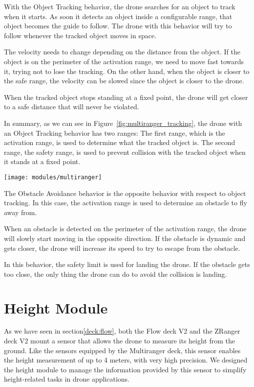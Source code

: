 With the Object Tracking behavior, the drone searches for an object to track when it starts. 
As soon it detects an object inside a configurable range, that object becomes the guide to follow. 
The drone with this behavior will try to follow whenever the tracked object moves in space. 

The velocity needs to change depending on the distance from the object. 
If the object is on the perimeter of the activation range, we need to move fast towards it, trying not to lose the tracking. 
On the other hand, when the object is closer to the safe range, the velocity can be slowed since the object is closer to the drone.

When the tracked object stops standing at a fixed point, the drone will get closer to a safe distance that will never be violated.

In summary, as we can see in Figure~\ref{fig:multiranger_tracking}, the drone with an Object Tracking behavior has two ranges:
The first range, which is the activation range, is used to determine what the tracked object is.
The second range, the safety range, is used to prevent collision with the tracked object when it stands at a fixed point.

\begin{SCfigure}[\sidecaptionrelwidth][h]
    \texttt{[image: modules/multiranger]}
    \caption{Multiranger Object Tracking behavior}\label{fig:multiranger_tracking}
\end{SCfigure}

The Obstacle Avoidance behavior is the opposite behavior with respect to object tracking. 
In this case, the activation range is used to determine an obstacle to fly away from.

When an obstacle is detected on the perimeter of the activation range, the drone will slowly start moving in the opposite direction. 
If the obstacle is dynamic and gets closer, the drone will increase its speed to try to escape from the obstacle.

In this behavior, the safety limit is used for landing the drone. 
If the obstacle gets too close, the only thing the drone can do to avoid the collision is landing.

\section{Height Module}\label{sec:module_height}

As we have seen in section\ref{deck:flow}, both the Flow deck V2 and the ZRanger deck V2 mount a sensor that allows the drone to measure its height from the ground.
Like the sensors equipped by the Multiranger deck, this sensor enables the height measurement of up to 4 meters, with very high precision.
We designed the height module to manage the information provided by this sensor to simplify height-related tasks in drone applications.

